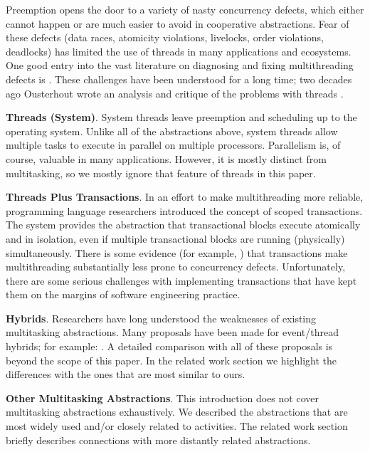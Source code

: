 \documentclass[9pt,preprint]{sigplanconf-2}
\begin{document}
Preemption opens the door to a variety of nasty concurrency defects, which either cannot happen or are much easier to avoid in cooperative abstractions.
Fear of these defects (data races, atomicity violations, livelocks, order violations, deadlocks) has limited the use of threads in many applications and ecosystems.
One good entry into the vast literature on diagnosing and fixing multithreading defects is \cite{Lu2008}.
These challenges have been understood for a long time; two decades ago Ousterhout wrote an analysis and critique of the problems with threads \cite{Ousterhout1996}.

\textbf{Threads (System)}.
System threads leave preemption and scheduling up to the operating system.
Unlike all of the abstractions above, system threads allow multiple tasks to execute in parallel on multiple processors.
Parallelism is, of course, valuable in many applications.
However, it is mostly distinct from multitasking, so we mostly ignore that feature of threads in this paper.

\textbf{Threads Plus Transactions}.
In an effort to make multithreading more reliable, programming language researchers introduced the concept of scoped transactions.
The system provides the abstraction that transactional blocks execute atomically and in isolation, even if multiple transactional blocks are running (physically) simultaneously.
There is some evidence (for example, \cite{Pankratius2014}) that transactions make multithreading substantially less prone to concurrency defects.
Unfortunately, there are some serious challenges with implementing transactions that have kept them on the margins of software engineering practice.

\textbf{Hybrids}.
Researchers have long understood the weaknesses of existing multitasking abstractions.
Many proposals have been made for event/thread hybrids; for example: \cite{Boudol2007, Boussinot2006, Cunningham2005, Dabrowski2006, Fischer2007, Kerneis2014, Krohn2007, Li2007, Behren2003}.
A detailed comparison with all of these proposals is beyond the scope of this paper.
In the related work section we highlight the differences with the ones that are most similar to ours.

\textbf{Other Multitasking Abstractions}.
This introduction does not cover multitasking abstractions exhaustively.
We described the abstractions that are most widely used and/or closely related to activities.
The related work section briefly describes connections with more distantly related abstractions.
\end{document}
